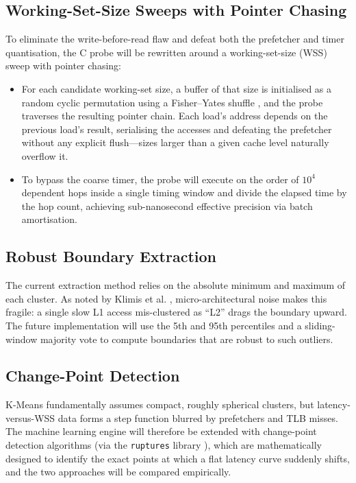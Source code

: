 \documentclass[conference]{IEEEtran}
\begin{document}
\subsection{Working-Set-Size Sweeps with Pointer Chasing}
To eliminate the write-before-read flaw and defeat both the prefetcher and timer quantisation, the C probe will be rewritten around a working-set-size (WSS) sweep with pointer chasing:
\begin{itemize}
    \item For each candidate working-set size, a buffer of that size is initialised as a random cyclic permutation using a Fisher--Yates shuffle \cite{knuth}, and the probe traverses the resulting pointer chain. Each load's address depends on the previous load's result, serialising the accesses and defeating the prefetcher without any explicit flush---sizes larger than a given cache level naturally overflow it.
    \item To bypass the coarse timer, the probe will execute on the order of $10^4$ dependent hops inside a single timing window and divide the elapsed time by the hop count, achieving sub-nanosecond effective precision via batch amortisation.
\end{itemize}

\subsection{Robust Boundary Extraction}
The current extraction method relies on the absolute minimum and maximum of each cluster. As noted by Klimis et al. \cite{klimis2025}, micro-architectural noise makes this fragile: a single slow L1 access mis-clustered as ``L2'' drags the boundary upward. The future implementation will use the 5th and 95th percentiles and a sliding-window majority vote to compute boundaries that are robust to such outliers.

\subsection{Change-Point Detection}
K-Means fundamentally assumes compact, roughly spherical clusters, but latency-versus-WSS data forms a step function blurred by prefetchers and TLB misses. The machine learning engine will therefore be extended with change-point detection algorithms (via the \texttt{ruptures} library \cite{ruptures}), which are mathematically designed to identify the exact points at which a flat latency curve suddenly shifts, and the two approaches will be compared empirically.
\end{document}
